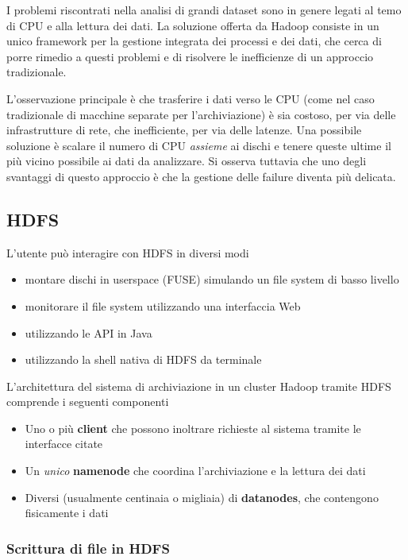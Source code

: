 \documentclass[italian,]{article}
\providecommand{\tightlist}{%
  \setlength{\itemsep}{0pt}\setlength{\parskip}{0pt}}
\begin{document}
I problemi riscontrati nella analisi di grandi dataset sono in genere
legati al temo di CPU e alla lettura dei dati. La soluzione offerta da
Hadoop consiste in un unico framework per la gestione integrata dei
processi e dei dati, che cerca di porre rimedio a questi problemi e di
risolvere le inefficienze di un approccio tradizionale.

L'osservazione principale è che trasferire i dati verso le CPU (come nel
caso tradizionale di macchine separate per l'archiviazione) è sia
costoso, per via delle infrastrutture di rete, che inefficiente, per via
delle latenze. Una possibile soluzione è scalare il numero di CPU
\emph{assieme} ai dischi e tenere queste ultime il più vicino possibile
ai dati da analizzare. Si osserva tuttavia che uno degli svantaggi di
questo approccio è che la gestione delle failure diventa più delicata.

\subsection{HDFS}\label{hdfs}

L'utente può interagire con HDFS in diversi modi

\begin{itemize}
\tightlist
\item
  montare dischi in userspace (FUSE) simulando un file system di basso
  livello
\item
  monitorare il file system utilizzando una interfaccia Web
\item
  utilizzando le API in Java
\item
  utilizzando la shell nativa di HDFS da terminale
\end{itemize}

L'architettura del sistema di archiviazione in un cluster Hadoop tramite
HDFS comprende i seguenti componenti

\begin{itemize}
\tightlist
\item
  Uno o più \textbf{client} che possono inoltrare richieste al sistema
  tramite le interfacce citate
\item
  Un \emph{unico} \textbf{namenode} che coordina l'archiviazione e la
  lettura dei dati
\item
  Diversi (usualmente centinaia o migliaia) di \textbf{datanodes}, che
  contengono fisicamente i dati
\end{itemize}

\subsubsection{Scrittura di file in
HDFS}\label{scrittura-di-file-in-hdfs}
\end{document}

